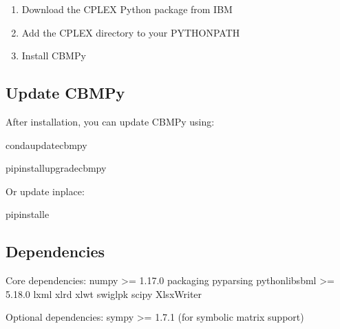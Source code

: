 \documentclass[letterpaper,12pt,english]{sphinxmanual}
\begin{document}
\sphinxAtStartPar
{}
\begin{enumerate}
%
\item {} 
\sphinxAtStartPar
Download the CPLEX Python package from IBM

\item {} 
\sphinxAtStartPar
Add the CPLEX directory to your PYTHONPATH

\item {} 
\sphinxAtStartPar
Install CBMPy

\end{enumerate}


\subsection{Update CBMPy}
\label{\detokenize{installation:update-cbmpy}}
\sphinxAtStartPar
After installation, you can update CBMPy using:

\begin{sphinxVerbatim}[commandchars=\\\{\}]
condaupdatecbmpy

pipinstall\PYGZhy{}\PYGZhy{}upgradecbmpy
\end{sphinxVerbatim}

\sphinxAtStartPar
Or update in\sphinxhyphen{}place:

\begin{sphinxVerbatim}[commandchars=\\\{\}]
pipinstall\PYGZhy{}e
\end{sphinxVerbatim}


\subsection{Dependencies}
\label{\detokenize{installation:dependencies}}
\sphinxAtStartPar
Core dependencies:
\sphinxhyphen{} numpy \textgreater{}= 1.17.0
\sphinxhyphen{} packaging
\sphinxhyphen{} pyparsing
\sphinxhyphen{} python\sphinxhyphen{}libsbml \textgreater{}= 5.18.0
\sphinxhyphen{} lxml
\sphinxhyphen{} xlrd
\sphinxhyphen{} xlwt
\sphinxhyphen{} swiglpk
\sphinxhyphen{} scipy
\sphinxhyphen{} XlsxWriter

\sphinxAtStartPar
Optional dependencies:
\sphinxhyphen{} sympy \textgreater{}= 1.7.1 (for symbolic matrix support)
\end{document}
